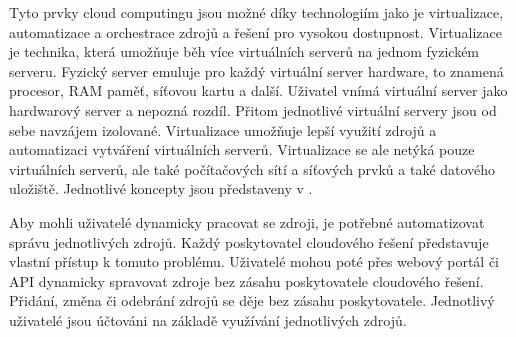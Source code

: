     Tyto prvky cloud computingu jsou možné díky technologiím jako je virtualizace, automatizace a orchestrace zdrojů a řešení pro vysokou dostupnost. Virtualizace je technika, která umožňuje běh více virtuálních serverů na jednom fyzickém serveru. \newline Fyzický server emuluje pro každý virtuální server hardware, to znamená procesor, RAM paměť, síťovou kartu a další. Uživatel vnímá virtuální server jako hardwarový server a nepozná rozdíl. Přitom jednotlivé virtuální servery jsou od sebe navzájem izolované. Virtualizace umožňuje lepší využití zdrojů a automatizaci vytváření virtuálních serverů. Virtualizace se ale netýká pouze virtuálních serverů, ale také počítačových sítí a síťových prvků a také datového uložiště. Jednotlivé koncepty jsou představeny v  \cite{murphy2017virtualization}. \par
    Aby mohli uživatelé dynamicky pracovat se zdroji, je potřebné automatizovat správu jednotlivých zdrojů. Každý poskytovatel cloudového řešení představuje vlastní přístup k tomuto problému. Uživatelé mohou poté přes webový portál či API dynamicky spravovat zdroje bez zásahu poskytovatele cloudového řešení. Přidání, změna či \linebreak odebrání zdrojů se děje bez zásahu poskytovatele. Jednotlivý uživatelé jsou účtováni na základě využívání jednotlivých zdrojů. 

